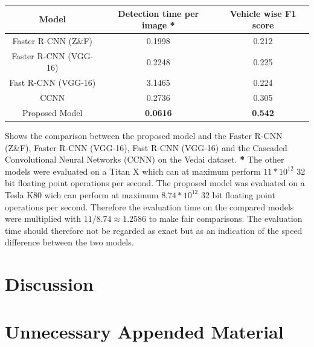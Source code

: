 \documentclass{kththesis}
\begin{document}
\begin{center}
 \label{tab:vedai} 
\begin{tabular}{|c | c c|}
\hline
\textbf{Model} & \textbf{Detection time per image *}  & \textbf{Vehicle wise F1 score}\\
\hline
Faster R-CNN (Z\&F) & 0.1998 & 0.212\\
Faster R-CNN (VGG-16) & 0.2248 & 0.225\\
Fast R-CNN (VGG-16) & 3.1465 &  0.224\\
CCNN &0.2736 &  0.305\\
Proposed Model & \textbf{0.0616} & \textbf{0.542}\\
\hline
\end{tabular}
\caption{Shows the comparison between the proposed model and the Faster R-CNN (Z\&F), Faster R-CNN (VGG-16), Fast R-CNN (VGG-16) \parencite{zeiler_visualizing_2014} and the Cascaded Convolutional Neural Networks (CCNN) \parencite{zhong_robust_2017-1} on the Vedai dataset. \textbf{*} The other models were evaluated on a Titan X which can at maximum perform $11*10^{12}$ 32 bit floating point operations per second. The proposed model was evaluated on a Tesla K80 wich can perform at maximum $8.74*10^{12}$ 32 bit floating point operations per second. Therefore the evaluation time on the compared models were multiplied with $11/8.74\approx1.2586$ to make fair comparisons. The evaluation time should therefore not be regarded as exact but as an indication of the speed difference between the two models.}
\end{center}
\chapter{Discussion}
\printbibliography[heading=bibintoc] %

\appendix

\chapter{Unnecessary Appended Material}
\end{document}
